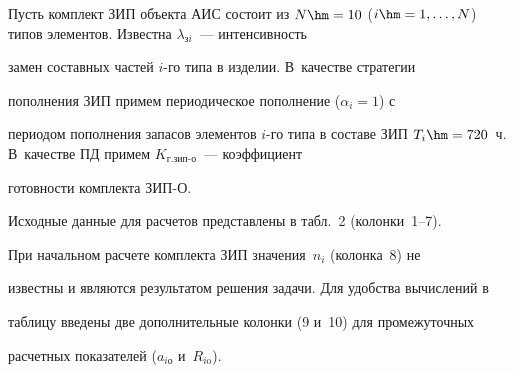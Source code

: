      Пусть комплект ЗИП объекта АИС состоит из $N \hm= 10$ ($i \hm= 


1,\ldots , N$) типов элементов. Известна $\lambda_{\mathrm{з}i}$~--- интенсивность 


замен составных частей $i$-го типа в изделии. В~качестве стратегии 


пополнения ЗИП примем периодическое пополнение ($\alpha_i = 1$) с 


периодом пополнения запасов элементов $i$-го типа в составе ЗИП $T_i \hm= 


720$~ч. В~качестве ПД примем $K_{\mathrm{г.зип\mbox{-}о}}$~--- коэффициент 


готовности комплекта ЗИП-О.


     


     Исходные данные для расчетов представлены в табл.~2 (колонки~1--7). 


При начальном расчете комплекта ЗИП значения~$n_i$ (колонка~8) не 


известны и являются результатом решения задачи. Для удобства вычислений в 


таблицу введены две дополнительные колонки (9 и~10) для промежуточных 


расчетных показателей ($a_{i\mathrm{о}}$ и~$R_{i\mathrm{o}}$).


     





